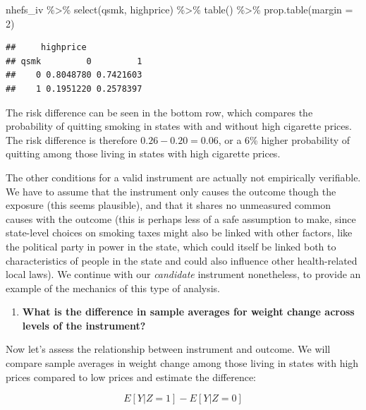 \documentclass[
]{book}
\newenvironment{Shaded}{\begin{snugshade}}{\end{snugshade}}
\newcommand{\AttributeTok}[1]{\textcolor[rgb]{0.77,0.63,0.00}{#1}}
\newcommand{\DecValTok}[1]{\textcolor[rgb]{0.00,0.00,0.81}{#1}}
\newcommand{\FunctionTok}[1]{\textcolor[rgb]{0.00,0.00,0.00}{#1}}
\newcommand{\NormalTok}[1]{#1}
\newcommand{\SpecialCharTok}[1]{\textcolor[rgb]{0.00,0.00,0.00}{#1}}
\providecommand{\tightlist}{%
  \setlength{\itemsep}{0pt}\setlength{\parskip}{0pt}}
\begin{document}
\begin{Shaded}
\begin{Highlighting}[]
\NormalTok{nhefs\_iv }\SpecialCharTok{\%\textgreater{}\%} 
  \FunctionTok{select}\NormalTok{(qsmk, highprice) }\SpecialCharTok{\%\textgreater{}\%} 
  \FunctionTok{table}\NormalTok{() }\SpecialCharTok{\%\textgreater{}\%} 
  \FunctionTok{prop.table}\NormalTok{(}\AttributeTok{margin =} \DecValTok{2}\NormalTok{)}
\end{Highlighting}
\end{Shaded}

\begin{verbatim}
##     highprice
## qsmk         0         1
##    0 0.8048780 0.7421603
##    1 0.1951220 0.2578397
\end{verbatim}

The risk difference can be seen in the bottom row, which compares the probability of quitting smoking in states with and without high cigarette prices. The risk difference is therefore \(0.26 - 0.20 = 0.06\), or a 6\% higher probability of quitting among those living in states with high cigarette prices.

The other conditions for a valid instrument are actually not empirically verifiable. We have to assume that the instrument only causes the outcome though the exposure (this seems plausible), and that it shares no unmeasured common causes with the outcome (this is perhaps less of a safe assumption to make, since state-level choices on smoking taxes might also be linked with other factors, like the political party in power in the state, which could itself be linked both to characteristics of people in the state and could also influence other health-related local laws). We continue with our \emph{candidate} instrument nonetheless, to provide an example of the mechanics of this type of analysis.

\begin{enumerate}
\def\labelenumi{\arabic{enumi}.}
\setcounter{enumi}{1}
\tightlist
\item
  \textbf{What is the difference in sample averages for weight change across levels of the instrument?}
\end{enumerate}

Now let's assess the relationship between instrument and outcome. We will compare sample averages in weight change among those living in states with high prices compared to low prices and estimate the difference:

\[
E[Y|Z=1] - E[Y|Z=0]
\]
\end{document}
